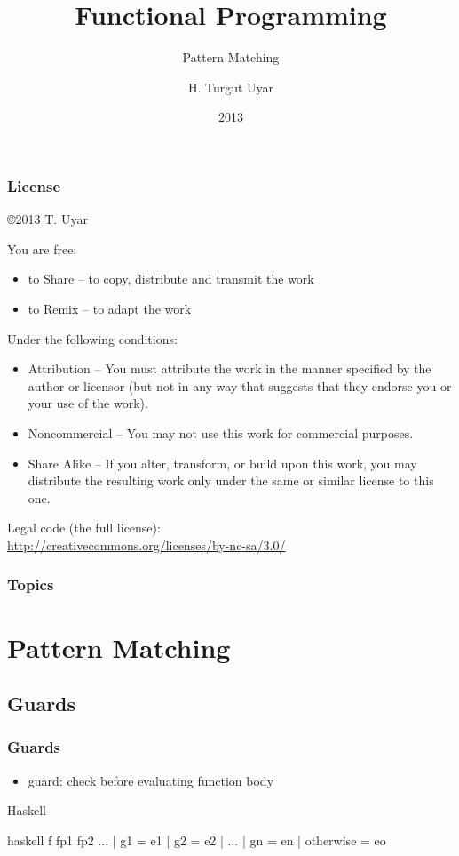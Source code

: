 \documentclass[dvipsnames]{beamer}
\title{Functional Programming}
\subtitle{Pattern Matching}
\author{H. Turgut Uyar}
\date{2013}
\theoremstyle{plain}
\begin{document}
\begin{frame}
  \titlepage
\end{frame}

\begin{frame}
  \frametitle{License}

  \hfill
  \copyright 2013 T. Uyar

  \vfill
  \begin{tiny}
    You are free:
    \begin{itemize}
      \item to Share -- to copy, distribute and transmit the work
      \item to Remix -- to adapt the work
    \end{itemize}

    Under the following conditions:
    \begin{itemize}
      \item Attribution -- You must attribute the work in the manner specified by
        the author or licensor (but not in any way that suggests that they
        endorse you or your use of the work).

      \item Noncommercial -- You may not use this work for commercial purposes.

      \item Share Alike -- If you alter, transform, or build upon this work, you
        may distribute the resulting work only under the same or similar license
        to this one.
    \end{itemize}
  \end{tiny}

  \vfill
  Legal code (the full license):\\
  \url{http://creativecommons.org/licenses/by-nc-sa/3.0/}
\end{frame}

\begin{frame}
  \frametitle{Topics}
  \tableofcontents
\end{frame}

\section{Pattern Matching}

\subsection{Guards}

\begin{frame}[fragile]
  \frametitle{Guards}

  \begin{itemize}
    \item \alert{guard}: check before evaluating function body
  \end{itemize}

  \begin{block}{Haskell}
    \begin{pygments}{haskell}
f fp1 fp2 ...
  | g1 = e1
  | g2 = e2
  | ...
  | gn = en
  | otherwise = eo
    \end{pygments}
  \end{block}
\end{frame}
\end{document}
